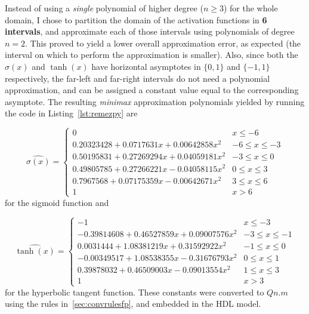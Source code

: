 Instead of using a \emph{single} polynomial of higher degree ($n \geq 3$) for the whole domain, I chose to partition the domain of the activation functions in \textbf{6 intervals}, and approximate each of those intervals using polynomials of degree $n=2$. This proved to yield a lower overall approximation error, as expected (the interval on which to perform the approximation is smaller). Also, since both the $\sigma(x)$ and $\tanh(x)$ have horizontal asymptotes in $\{0,1\}$ and $\{-1,1\}$ respectively, the far-left and far-right intervals do not need a polynomial approximation, and can be assigned a constant value equal to the corresponding asymptote. The resulting \textit{minimax} approximation polynomials yielded by running the code in Listing~\ref{lst:remezpy} are

\begin{equation}\label{eq:coefs_sigm}
\hat{\sigma(x)} = \left\{ 
\begin{array}{lc} 
0 & x  \leq -6 \\
0.20323428 + 0.0717631x + 0.00642858x^2 & -6 \leq x \leq -3 \\
0.50195831 + 0.27269294x + 0.04059181x^2 & -3 \leq  x \leq 0 \\
0.49805785 + 0.27266221x - 0.04058115x^2 &  0 \leq  x \leq 3 \\
0.7967568 + 0.07175359x - 0.00642671x^2 & 3 \leq  x \leq 6 \\
1 & x > 6
\end{array}
\right.
\end{equation}
for the sigmoid function and

\begin{equation}\label{eq:coefs_tanh}
\hat{\tanh(x)} = \left\{ 
\begin{array}{lc} 
-1 & x  \leq -3 \\
-0.39814608 + 0.46527859x + 0.09007576x^2 & -3 \leq x \leq -1 \\
0.0031444 + 1.08381219x + 0.31592922x^2 & -1 \leq  x \leq 0 \\
-0.00349517 + 1.08538355x -0.31676793x^2 &  0 \leq  x \leq 1 \\
0.39878032 + 0.46509003x - 0.09013554x^2 & 1 \leq  x \leq 3 \\
1 & x > 3
\end{array}
\right.
\end{equation}
for the hyperbolic tangent function. These constants were converted to $Qn.m$ using the rules in~\ref{sec:convrulesfp}, and embedded in the HDL model.

